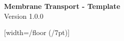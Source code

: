 \documentclass{article}
\begin{document}
\begin{Large}
      \begin{singlespace}
            \begin{center}
                  \textbf{Membrane Transport - Template} \\
                  Version 1.0.0
            \end{center}
      \end{singlespace}
\end{Large}

\vspace*{10mm}

{
      [width=\pgfdecoratedpathlength/floor (\pgfdecoratedpathlength/7pt)]
      {
            \pgfpathmoveto{\pgfpoint{-1pt}{0pt}}
            \pgfpathlineto{\pgfpoint{-1pt}{-10pt}}
            \pgfpathmoveto{\pgfpoint{1pt}{0pt}}
            \pgfpathlineto{\pgfpoint{1pt}{-10pt}}
            \pgfpathmoveto{\pgfpoint{1pt}{0pt}}
            \pgfpathcircle{\pgfpoint{0pt}{2pt}}{2.5pt}
      }
      {
            \pgfpathmoveto{\pgfpointdecoratedpathlast}
      }
}
\end{document}
